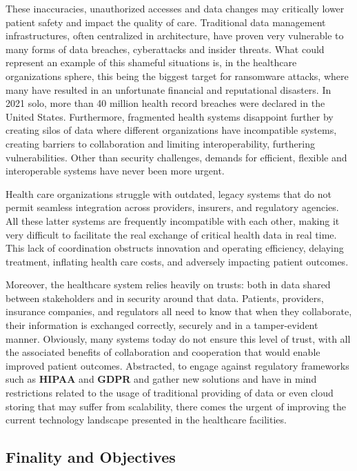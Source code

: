 These inaccuracies, unauthorized accesses and data changes may critically lower patient safety and impact the quality of care. Traditional data management infrastructures, often centralized in architecture, have proven very vulnerable to many forms of data breaches, cyberattacks and insider threats. What could represent an example of this shameful situations is, in the healthcare organizations sphere, this being the biggest target for ransomware attacks, where many have resulted in an unfortunate financial and reputational disasters. In 2021 solo, more than 40 million health record breaches were 
declared in the United States. Furthermore, fragmented health systems disappoint further by creating silos of data where different organizations have incompatible systems, creating barriers to collaboration and limiting interoperability, furthering vulnerabilities. Other than security challenges, demands for efficient, flexible and interoperable systems have never been more urgent.

Health care organizations struggle with outdated, legacy systems that do not permit seamless integration across providers, insurers, and regulatory agencies. All these latter systems are frequently incompatible with each other, making it very difficult to facilitate the real exchange of critical health data in real time. This lack of coordination obstructs innovation and operating efficiency, delaying treatment, inflating health care costs, and adversely impacting patient outcomes.

Moreover, the healthcare system relies heavily on trusts: both in data shared between stakeholders and in security around that data. Patients, providers, insurance companies, and regulators all need to know that when they collaborate, their information is exchanged correctly, securely and in a tamper-evident manner. Obviously, many systems today do not ensure this level of trust, with all the associated benefits of collaboration and cooperation that would enable improved patient outcomes. Abstracted, to engage against regulatory frameworks such as \textbf{HIPAA} and \textbf{GDPR} and gather new solutions and have in mind restrictions related to the usage of traditional providing of data or even cloud storing that may suffer from scalability,  there comes the urgent of improving the current technology landscape presented in the healthcare facilities.

\subsection{Finality and Objectives}

